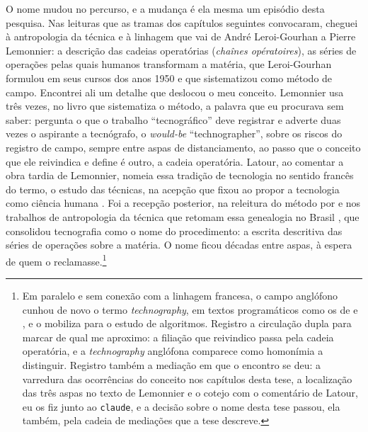 O nome mudou no percurso, e a mudança é ela mesma um episódio desta pesquisa. Nas leituras que as tramas dos capítulos seguintes convocaram, cheguei à antropologia da técnica e à linhagem que vai de André Leroi-Gourhan a Pierre Lemonnier: a descrição das cadeias operatórias (\emph{chaînes opératoires}), as séries de operações pelas quais humanos transformam a matéria, que Leroi-Gourhan formulou em seus cursos dos anos 1950 e que \textcite{Lemonnier1992Elements} sistematizou como método de campo. Encontrei ali um detalhe que deslocou o meu conceito. Lemonnier usa três vezes, no livro que sistematiza o método, a palavra que eu procurava sem saber: pergunta o que o trabalho \enquote{tecnográfico} deve registrar e adverte duas vezes o aspirante a tecnógrafo, o \emph{would-be} \enquote{technographer}, sobre os riscos do registro de campo, sempre entre aspas de distanciamento, ao passo que o conceito que ele reivindica e define é outro, a cadeia operatória. Latour, ao comentar a obra tardia de Lemonnier, nomeia essa tradição de tecnologia no sentido francês do termo, o estudo das técnicas, na acepção que \textcite{Haudricourt1987Technologie} fixou ao propor a tecnologia como ciência humana \parencite{Latour2014Technical}. Foi a recepção posterior, na releitura do método por \textcite{Coupaye2017Cadeia} e nos trabalhos de antropologia da técnica que retomam essa genealogia no Brasil \parencite{Mura2011Sujeitos}, que consolidou tecnografia como o nome do procedimento: a escrita descritiva das séries de operações sobre a matéria. O nome ficou décadas entre aspas, à espera de quem o reclamasse.\footnote{Em paralelo e sem conexão com a linhagem francesa, o campo anglófono cunhou de novo o termo \emph{technography}, em textos programáticos como os de \textcite{Kien2008Technography} e \textcite{Jansen2011Technography}, e \textcite{Bucher2018IfThen} o mobiliza para o estudo de algoritmos. Registro a circulação dupla para marcar de qual me aproximo: a filiação que reivindico passa pela cadeia operatória, e a \emph{technography} anglófona comparece como homonímia a distinguir. Registro também a mediação em que o encontro se deu: a varredura das ocorrências do conceito nos capítulos desta tese, a localização das três aspas no texto de Lemonnier e o cotejo com o comentário de Latour, eu os fiz junto ao \texttt{claude}, e a decisão sobre o nome desta tese passou, ela também, pela cadeia de mediações que a tese descreve.}


